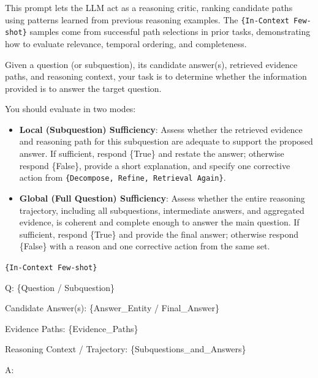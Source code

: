 \noindent
This prompt lets the LLM act as a reasoning critic, ranking candidate paths using patterns learned from previous reasoning examples.  
The \texttt{\{In-Context Few-shot\}} samples come from successful path selections in prior tasks, demonstrating how to evaluate relevance, temporal ordering, and completeness.


\begin{center}
\begin{minipage}{0.9\columnwidth}
\vspace{2mm}
\centering
\begin{tcolorbox}[title=Sufficiency Evaluation Prompt Template]
\small
Given a question (or subquestion), its candidate answer(s), retrieved evidence paths, and reasoning context, your task is to determine whether the information provided is  to answer the target question.

You should evaluate in two modes:
\begin{itemize}[leftmargin=10pt]
    \item \textbf{Local (Subquestion) Sufficiency}: Assess whether the retrieved evidence and reasoning path for this subquestion are adequate to support the proposed answer.  
    If sufficient, respond \{True\} and restate the answer; otherwise respond \{False\}, provide a short explanation, and specify one corrective action from \texttt{\{Decompose, Refine, Retrieval Again\}}.
    \item \textbf{Global (Full Question) Sufficiency}: Assess whether the entire reasoning trajectory, including all subquestions, intermediate answers, and aggregated evidence, is coherent and complete enough to answer the main question.  
    If sufficient, respond \{True\} and provide the final answer; otherwise respond \{False\} with a reason and one corrective action from the same set.
\end{itemize}

\vspace{5pt}
\texttt{\{In-Context Few-shot\}}

\vspace{5pt}
Q: \{Question / Subquestion\}  

Candidate Answer(s): \{Answer\_Entity / Final\_Answer\}  

Evidence Paths: \{Evidence\_Paths\}  

Reasoning Context / Trajectory: \{Subquestions\_and\_Answers\}  

A:
\end{tcolorbox}
\end{minipage}
\end{center}


